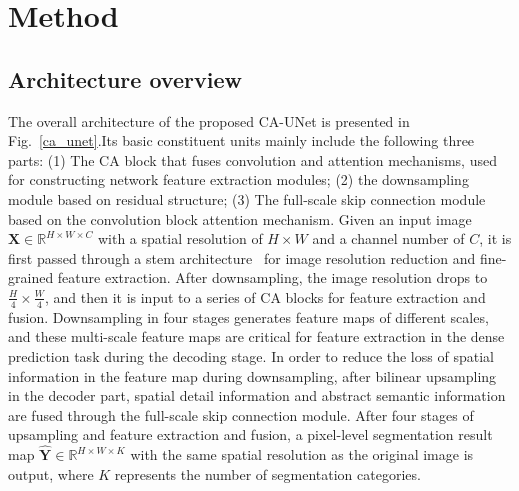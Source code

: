 \section{Method}

\subsection{Architecture overview}

The overall architecture of the proposed CA-UNet is presented in Fig.~\ref{ca_unet}.Its basic constituent units mainly include the following three parts: (1) The CA block that fuses convolution and attention mechanisms, used for constructing network feature extraction modules; (2) the downsampling module based on residual structure; (3) The full-scale skip connection module based on the convolution block attention mechanism. Given an input image $\pmb{X} \in \mathbb{R}^{H \times W \times C}$ with a spatial resolution of $H \times W$ and a channel number of $C$, it is first passed through a stem architecture~\cite{he2019bag} for image resolution reduction and fine-grained feature extraction. After downsampling, the image resolution drops to $\frac{H}{4} \times \frac{W}{4}$, and then it is input to a series of CA blocks for feature extraction and fusion. Downsampling in four stages generates feature maps of different scales, and these multi-scale feature maps are critical for feature extraction in the dense prediction task during the decoding stage. In order to reduce the loss of spatial information in the feature map during downsampling, after bilinear upsampling in the decoder part, spatial detail information and abstract semantic information are fused through the full-scale skip connection module. After four stages of upsampling and feature extraction and fusion, a pixel-level segmentation result map  $\hat{\pmb{Y}}\in \mathbb{R}^{H \times W \times K}$ with the same spatial resolution as the original image is output, where $K$ represents the number of segmentation categories.

